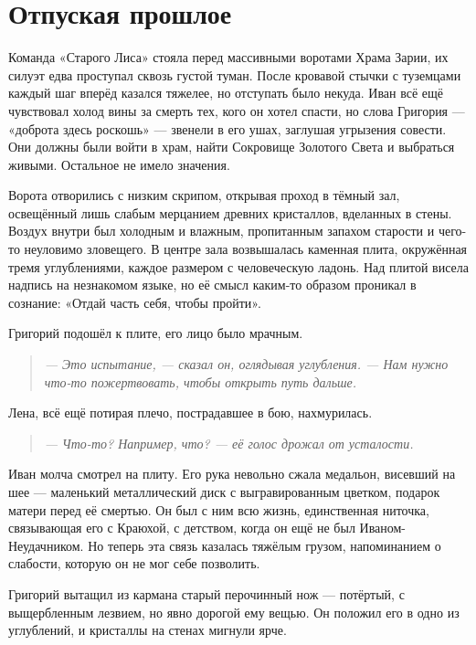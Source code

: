 \documentclass[12pt,a4paper]{book} %
\newenvironment{dialogue}{\begin{quote}\itshape}{\end{quote}}
\begin{document}
\chapter{Отпуская прошлое}

Команда «Старого Лиса» стояла перед массивными воротами Храма Зарии, их силуэт едва проступал сквозь густой туман. После кровавой стычки с туземцами каждый шаг вперёд казался тяжелее, но отступать было некуда. Иван всё ещё чувствовал холод вины за смерть тех, кого он хотел спасти, но слова Григория --- «доброта здесь роскошь» --- звенели в его ушах, заглушая угрызения совести. Они должны были войти в храм, найти Сокровище Золотого Света и выбраться живыми. Остальное не имело значения.

Ворота отворились с низким скрипом, открывая проход в тёмный зал, освещённый лишь слабым мерцанием древних кристаллов, вделанных в стены. Воздух внутри был холодным и влажным, пропитанным запахом старости и чего-то неуловимо зловещего. В центре зала возвышалась каменная плита, окружённая тремя углублениями, каждое размером с человеческую ладонь. Над плитой висела надпись на незнакомом языке, но её смысл каким-то образом проникал в сознание: «Отдай часть себя, чтобы пройти».

Григорий подошёл к плите, его лицо было мрачным.

\begin{dialogue}
--- Это испытание, --- сказал он, оглядывая углубления. --- Нам нужно что-то пожертвовать, чтобы открыть путь дальше.
\end{dialogue}

Лена, всё ещё потирая плечо, пострадавшее в бою, нахмурилась.

\begin{dialogue}
--- Что-то? Например, что? --- её голос дрожал от усталости.
\end{dialogue}

Иван молча смотрел на плиту. Его рука невольно сжала медальон, висевший на шее --- маленький металлический диск с выгравированным цветком, подарок матери перед её смертью. Он был с ним всю жизнь, единственная ниточка, связывающая его с Краюхой, с детством, когда он ещё не был Иваном-Неудачником. Но теперь эта связь казалась тяжёлым грузом, напоминанием о слабости, которую он не мог себе позволить.

Григорий вытащил из кармана старый перочинный нож --- потёртый, с выщербленным лезвием, но явно дорогой ему вещью. Он положил его в одно из углублений, и кристаллы на стенах мигнули ярче.
\end{document}
